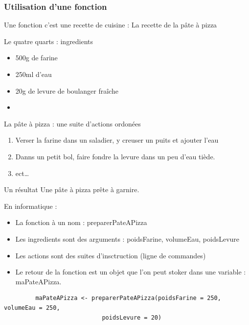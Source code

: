 \documentclass[table,svgnames,hyperref={pdfpagemode=FullScreen}]{beamer}
\begin{document}
\begin{frame}
	\frametitle{Utilisation d'une fonction}
	Une fonction c'est une recette de cuisine : La recette de la pâte à pizza
	\begin{exampleblock}{Le quatre quarts : ingredients}
		\begin{itemize}
			\item 500g de farine
			\item 250ml d'eau
			\item 20g de levure de boulanger fraîche
			\item 
		\end{itemize}
	\end{exampleblock}
\end{frame}
\begin{frame}
	\begin{exampleblock}{La pâte à pizza :  une suite d'actions ordonées}
		\begin{enumerate}
			\item Verser la farine dans un saladier, y creuser un puits et ajouter l'eau
			\item Danns un petit bol, faire fondre la levure dans un peu d'eau tiède.
			\item ect\dots
		\end{enumerate}
			
	\end{exampleblock}
\end{frame}
\begin{frame}
	\begin{exampleblock}{Un résultat}
		Une pâte à pizza prête à garnire.
	\end{exampleblock}
\end{frame}
\begin{frame}[fragile]
	\begin{exampleblock}{En informatique : }
		\begin{itemize}
			\item La fonction à un nom  : preparerPateAPizza
			\item Les ingredients sont des arguments : poidsFarine, volumeEau, poidsLevure
			\item Les actions sont des suites d'insctruction (ligne de commandes)
			\item Le retour de la fonction est un objet que l'on peut stoker dans une variable : maPateAPizza.
		\end{itemize}
		\begin{lstlisting}
		 maPateAPizza <- preparerPateAPizza(poidsFarine = 250, volumeEau = 250, 
							poidsLevure = 20) 
		 \end{lstlisting}
	\end{exampleblock}
	
\end{frame}
\end{document}
